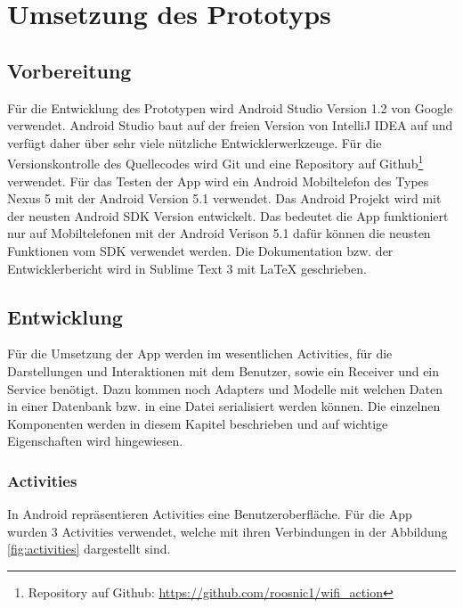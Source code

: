 \chapter{Umsetzung des Prototyps}
\label{sec:umsetzung}

\section{Vorbereitung}
Für die Entwicklung des Prototypen wird Android Studio Version 1.2 von Google verwendet. Android Studio baut auf der freien Version von IntelliJ IDEA auf und verfügt daher über sehr viele nützliche Entwicklerwerkzeuge. Für die Versionskontrolle des Quellecodes wird Git und eine Repository auf Github\footnote{Repository auf Github: \url{https://github.com/roosnic1/wifi_action}} verwendet. Für das Testen der App wird ein Android Mobiltelefon des Types Nexus 5 mit der Android Version 5.1 verwendet. Das Android Projekt wird mit der neusten Android SDK Version entwickelt. Das bedeutet die App funktioniert nur auf Mobiltelefonen mit der Android Verison 5.1 dafür können die neusten Funktionen vom SDK verwendet werden. Die Dokumentation bzw. der Entwicklerbericht wird in Sublime Text 3 mit \LaTeX{} geschrieben.

\section{Entwicklung}
Für die Umsetzung der App werden im wesentlichen Activities, für die Darstellungen und Interaktionen mit dem Benutzer, sowie ein Receiver und ein Service benötigt. Dazu kommen noch Adapters und Modelle mit welchen Daten in einer Datenbank bzw. in eine Datei serialisiert werden können. Die einzelnen Komponenten werden in diesem Kapitel beschrieben und auf wichtige Eigenschaften wird hingewiesen.

\subsection{Activities}
In Android repräsentieren Activities eine Benutzeroberfläche. Für die App wurden 3 Activities verwendet, welche mit ihren Verbindungen in der Abbildung \ref{fig:activities} dargestellt sind.

